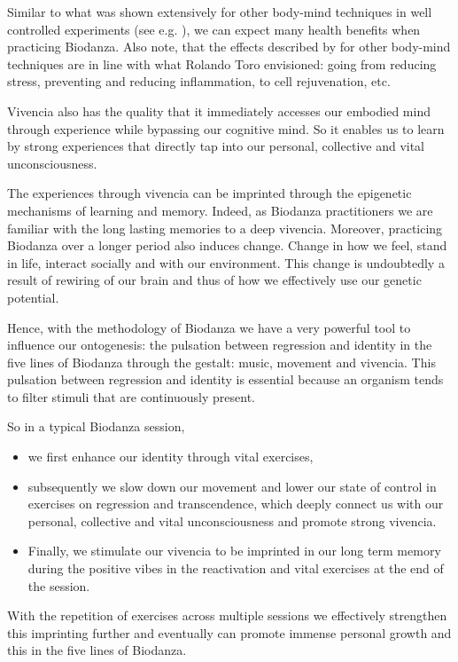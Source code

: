 \documentclass[
  11pt,
]{book}
\providecommand{\tightlist}{%
  \setlength{\itemsep}{0pt}\setlength{\parskip}{0pt}}
\begin{document}
Similar to what was shown extensively for other body-mind techniques in well controlled experiments (see e.g. \citet{BlackburnEpel2017}), we can expect many health benefits when practicing Biodanza. Also note, that the effects described by \citet{BlackburnEpel2017} for other body-mind techniques are in line with what Rolando Toro envisioned: going from reducing stress, preventing and reducing inflammation, to cell rejuvenation, etc.

Vivencia also has the quality that it immediately accesses our embodied mind through experience while bypassing our cognitive mind. So it enables us to learn by strong experiences that directly tap into our personal, collective and vital unconsciousness.

The experiences through vivencia can be imprinted through the epigenetic mechanisms of learning and memory. Indeed, as Biodanza practitioners we are familiar with the long lasting memories to a deep vivencia. Moreover, practicing Biodanza over a longer period also induces change.
Change in how we feel, stand in life, interact socially and with our environment.
This change is undoubtedly a result of rewiring of our brain and thus of how we effectively use our genetic potential.

Hence, with the methodology of Biodanza we have a very powerful tool to influence our ontogenesis: the pulsation between regression and identity in the five lines of Biodanza through the gestalt: music, movement and vivencia.
This pulsation between regression and identity is essential because an organism tends to filter stimuli that are continuously present.

So in a typical Biodanza session,

\begin{itemize}
\tightlist
\item
  we first enhance our identity through vital exercises,
\item
  subsequently we slow down our movement and lower our state of control in exercises on regression and transcendence, which deeply connect us with our personal, collective and vital unconsciousness and promote strong vivencia.
\item
  Finally, we stimulate our vivencia to be imprinted in our long term memory during the positive vibes in the reactivation and vital exercises at the end of the session.
\end{itemize}

With the repetition of exercises across multiple sessions we effectively strengthen this imprinting further and eventually can promote immense personal growth and this in the five lines of Biodanza.
\end{document}
